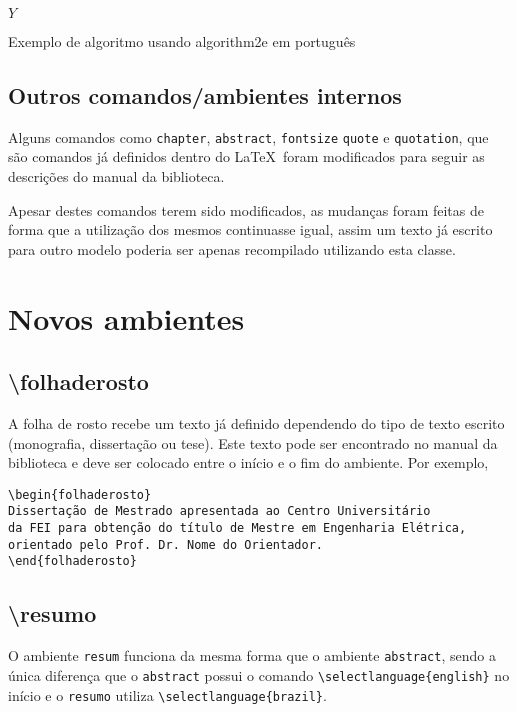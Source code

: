 \documentclass{fei}
\begin{document}
\begin{algorithm}


\Retorna \(Y\)

\caption{Exemplo de algoritmo usando algorithm2e em português}
\label{lst:alg}
\end{algorithm}
    
    \subsection{Outros comandos/ambientes internos}
    
    Alguns comandos como \texttt{chapter}, \texttt{abstract}, \texttt{fontsize} \texttt{quote} e \texttt{quotation}, que são comandos já definidos dentro do \LaTeX~foram modificados para seguir as descrições do manual da biblioteca.

    Apesar destes comandos terem sido modificados, as mudanças foram feitas de forma que a utilização dos mesmos continuasse igual, assim um texto já escrito para outro modelo poderia ser apenas recompilado utilizando esta classe.

\section{Novos ambientes}

    \subsection{\textbackslash folhaderosto}
    A folha de rosto recebe um texto já definido dependendo do tipo de texto escrito (monografia, dissertação ou tese). Este texto pode ser encontrado no manual da biblioteca e deve ser colocado entre o início e o fim do ambiente. Por exemplo,
    \begin{verbatim}
\begin{folhaderosto}
Dissertação de Mestrado apresentada ao Centro Universitário
da FEI para obtenção do título de Mestre em Engenharia Elétrica, 
orientado pelo Prof. Dr. Nome do Orientador. 
\end{folhaderosto}
    \end{verbatim}

    \subsection{\textbackslash resumo}
    O ambiente \texttt{resum} funciona da mesma forma que o ambiente \texttt{abstract}, sendo a única diferença que o \texttt{abstract} possui o comando \verb+\selectlanguage{english}+ no início e o \texttt{resumo} utiliza \verb+\selectlanguage{brazil}+.
\end{document}
